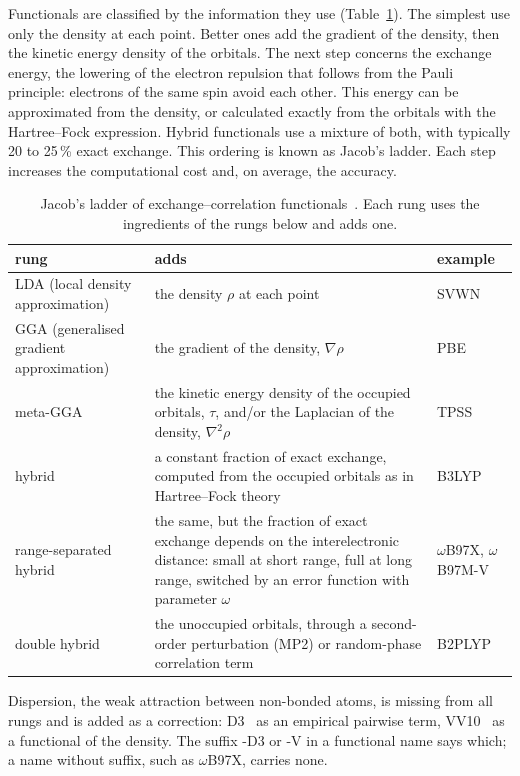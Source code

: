 Functionals are classified by the information they use
(Table~\ref{tab:functionals}). The simplest use only the density at each
point. Better ones add the gradient of the density, then the kinetic energy
density of the orbitals. The next step concerns the exchange energy, the
lowering of the electron repulsion that follows from the Pauli principle:
electrons of the same spin avoid each other. This energy can be
approximated from the density, or calculated exactly from the orbitals with
the Hartree--Fock expression. Hybrid functionals use a mixture of both, with
typically 20 to 25\,\% exact exchange. This ordering is known as Jacob's
ladder. Each step increases the computational cost and, on average, the
accuracy.

\begin{table}[h]
\centering
\caption{Jacob's ladder of exchange--correlation
functionals~\cite{perdew2001}. Each rung uses the ingredients of the rungs
below and adds one.}
\label{tab:functionals}
\begin{tabular}{@{}l p{7.4cm} l@{}}
\toprule
rung & adds & example \\
\midrule
LDA (local density approximation) & the density $\rho$ at each point & SVWN \\
GGA (generalised gradient approximation) & the gradient of the density, $\nabla\rho$ & PBE \\
meta-GGA & the kinetic energy density of the occupied orbitals, $\tau$,
  and/or the Laplacian of the density, $\nabla^2\rho$ & TPSS \\
hybrid & a constant fraction of exact exchange, computed from the occupied
  orbitals as in Hartree--Fock theory & B3LYP \\
range-separated hybrid & the same, but the fraction of exact exchange
  depends on the interelectronic distance: small at short range, full at
  long range, switched by an error function with parameter $\omega$ &
  $\omega$B97X, $\omega$B97M-V \\
double hybrid & the unoccupied orbitals, through a second-order
  perturbation (MP2) or random-phase correlation term & B2PLYP \\
\bottomrule
\end{tabular}
\end{table}

Dispersion, the weak attraction between non-bonded atoms, is missing from
all rungs and is added as a correction: D3~\cite{grimme2010} as an
empirical pairwise term, VV10~\cite{vydrov2010} as a functional of the
density. The suffix -D3 or -V in a functional name says which; a name
without suffix, such as $\omega$B97X, carries none.

